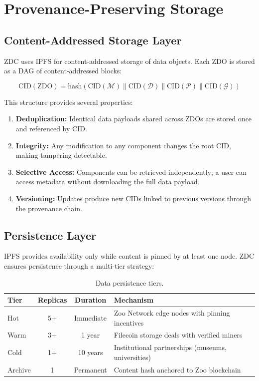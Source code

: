 \section{Provenance-Preserving Storage}

\label{sec:storage}

\subsection{Content-Addressed Storage Layer}

ZDC uses IPFS for content-addressed storage of data objects.
Each ZDO is stored as a DAG of content-addressed blocks:

\begin{equation}
    \text{CID}(\text{ZDO}) = \text{hash}(\text{CID}(\mathcal{M}) \| \text{CID}(\mathcal{D}) \| \text{CID}(\mathcal{P}) \| \text{CID}(\mathcal{G}))
\end{equation}

This structure provides several properties:

\begin{enumerate}[leftmargin=*]
    \item \textbf{Deduplication:} Identical data payloads shared across ZDOs are stored once and referenced by CID.
    \item \textbf{Integrity:} Any modification to any component changes the root CID, making tampering detectable.
    \item \textbf{Selective Access:} Components can be retrieved independently; a user can access metadata without downloading the full data payload.
    \item \textbf{Versioning:} Updates produce new CIDs linked to previous versions through the provenance chain.
\end{enumerate}

\subsection{Persistence Layer}

IPFS provides availability only while content is pinned by at least one node.
ZDC ensures persistence through a multi-tier strategy:

\begin{table}[H]
\centering
\caption{Data persistence tiers.}
\label{tab:persistence}
\begin{tabularx}{\textwidth}{@{}lccX@{}}
\toprule
\textbf{Tier} & \textbf{Replicas} & \textbf{Duration} & \textbf{Mechanism} \\
\midrule
Hot & 5+ & Immediate & Zoo Network edge nodes with pinning incentives \\
Warm & 3+ & 1 year & Filecoin storage deals with verified miners \\
Cold & 1+ & 10 years & Institutional partnerships (museums, universities) \\
Archive & 1 & Permanent & Content hash anchored to Zoo blockchain \\
\bottomrule
\end{tabularx}
\end{table}

